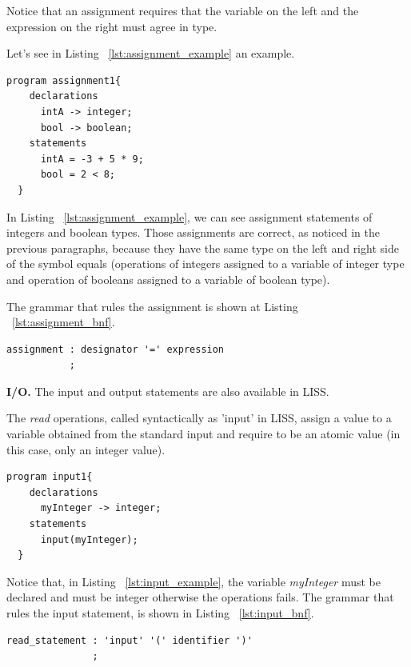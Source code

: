 \documentclass[
  oneside,
  11pt, a4paper,
  footinclude=true,
  headinclude=true,
  cleardoublepage=empty
]{scrbook}
\begin{document}
Notice that an assignment requires that the variable on the left and the expression on the right must agree in type.

Let's see in Listing ~\ref{lst:assignment_example} an example.

\begin{lstlisting}[caption={Example of assignment in LISS},label={lst:assignment_example}]
  program assignment1{
    declarations
      intA -> integer;
      bool -> boolean;  
    statements
      intA = -3 + 5 * 9;
      bool = 2 < 8;
  }
\end{lstlisting}

In Listing ~\ref{lst:assignment_example}, we can see assignment statements of integers and boolean types.
Those assignments are correct, as noticed in the previous paragraphs, because they have the same type on the left and right side of the symbol equals (operations of integers assigned to a variable of integer type and operation of booleans assigned to a variable of boolean type).

The grammar that rules the assignment is shown at Listing ~\ref{lst:assignment_bnf}.

\begin{lstlisting}[caption={CFG for assignment in LISS},label={lst:assignment_bnf}]
  assignment : designator '=' expression
           ;
\end{lstlisting}

\textbf{I/O.} The input and output statements are also available in LISS.

The \textit{read} operations, called syntactically as 'input' in LISS, assign a value to a variable obtained from the standard input and require to be an atomic value (in this case, only an integer value).


\begin{lstlisting}[caption={Example of input operation in LISS}, label={lst:input_example}]
  program input1{
    declarations
      myInteger -> integer;
    statements
      input(myInteger);
  }
\end{lstlisting}

Notice that, in Listing ~\ref{lst:input_example}, the variable \textit{myInteger} must be declared  and must be integer otherwise the operations fails.
The grammar that rules the input statement, is shown in Listing ~\ref{lst:input_bnf}.

\begin{lstlisting}[caption={CFG for input operation in LISS}, label={lst:input_bnf}]
 read_statement : 'input' '(' identifier ')'
               ; 
\end{lstlisting}
\end{document}
